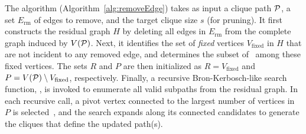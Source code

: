 



%
The algorithm (Algorithm~\ref{alg:removeEdge}) takes as input a clique path $\TPath$, a set $E_{\mathrm{rm}}$ of edges to remove, and the target clique size $s$ (for pruning). 
It first constructs the residual graph $H$ by deleting all edges in $E_{\mathrm{rm}}$ from the complete graph induced by $V(\TPath)$. 
Next, it identifies the set of \emph{fixed} vertices $V_{\text{fixed}}$ in $H$ that are not incident to any removed edge, and determines the subset of \pivots\ among these fixed vertices. 
The sets $R$ and $P$ are then initialized as $R = V_{\text{fixed}}$ and $P = V(\TPath) \setminus V_{\text{fixed}}$, respectively. 
%
Finally, a recursive Bron-Kerbosch-like search function, \BK, is invoked to enumerate all valid subpaths from the residual graph. 
In each recursive call, a pivot vertex connected to the largest number of vertices in $P$ is selected~\cite{BronKerbosch}, and the search expands along its connected candidates to generate the cliques that define the updated path(s).



